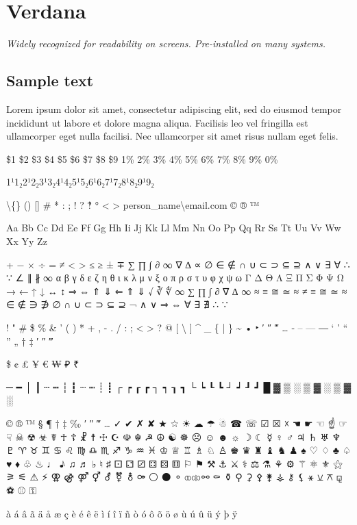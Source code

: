 \section{Verdana}
\emph{Widely recognized for readability on screens. Pre-installed on many systems.}
\begin{raggedright}
\section*{Sample text}
Lorem ipsum dolor sit amet, consectetur adipiscing elit, sed do eiusmod tempor incididunt ut labore et dolore magna aliqua. Facilisis leo vel fringilla est ullamcorper eget nulla facilisi. Nec ullamcorper sit amet risus nullam eget felis.

\$1 \$2 \$3 \$4 \$5 \$6 \$7 \$8 \$9 1\% 2\% 3\% 4\% 5\% 6\% 7\% 8\% 9\% 0\%

1¹1₂2¹2₂3¹3₂4¹4₂5¹5₂6¹6₂7¹7₂8¹8₂9¹9₂

\textbackslash\{\} () [] \# * : ; ! ? ‽ ° \textless{} \textgreater{} person\_name\textbackslash{}email.com © ® ™

Aa Bb Cc Dd Ee Ff Gg Hh Ii Jj Kk Ll Mm Nn Oo Pp Qq Rr Ss Tt Uu Vv Ww Xx Yy Zz

+ − × ÷ = ≠ < > ≤ ≥ ± ∓
∑ ∏ ∫ ∂ ∞ ∇ ∆ ∝ ∅ ∈ ∉ ∩ ∪ ⊂ ⊃ ⊆ ⊇ ∧ ∨ ∃ ∀ ∴ ∵ ∠ ∥ ∦ ∞
α β γ δ ε ζ η θ ι κ λ μ ν ξ ο π ρ σ τ υ φ χ ψ ω
Γ Δ Θ Λ Ξ Π Σ Φ Ψ Ω
→ ← ↑ ↓ ↔ ↕ ⇒ ⇔ ⇑ ⇓ ⇐ ⇑ ⇓
√ ∛ ∜ ∞ ∑ ∏ ∫ ∂ ∇ ∆ ∞ ≈ ≡ ≅ ≃ ≈ ≠ ≡ ≅ ≃ ≈
∈ ∉ ∋ ∌ ∅ ∩ ∪ ⊂ ⊃ ⊆ ⊇
¬ ∧ ∨ ⇒ ⇔ ∀ ∃ ∄ ∴ ∵

! " \# \$ \% \& ' ( ) * + , - . / : ; \textless{} \textgreater{} ? @ [ \textbackslash{} ] \^{} \_ \{ | \} \~{}
• ‣ ′ ″ ‴ … ‐ – — ― ‘ ’ “ ” „ † ‡ ′ ″ ‴

\$ ¢ £ ¥ € ₩ ₽ ₹

─ ━ │ ┃ ┄ ┅ ┆ ┇ ┈ ┉ ┊ ┋ ┌ ┍ ┎ ┏ ┐ ┑ ┒ ┓ └ ┕ ┖ ┗ ┘ ┙ ┚ ┛
█ ▓ ▒ ░ ▒ ▓ ░ ▒ ▓ ░

© ® ™ § ¶ † ‡ ‰ ′ ″ ‴ … ✓ ✔ ✗ ✘ ★ ☆ ☀ ☁ ☂ ☃ ☎ ☏ ☑ ☒ ☓ ☚ ☛ ☜ ☝ ☞ ☟ ☠ ☢ ☣ ☤ ☥ ☦ ☧ ☨ ☩ ☪ ☫ ☬ ☭ ☮ ☯ ☸ ☹ ☺ ☻ ☼ ☽ ☾ ☿ ♀ ♂ ♃ ♄ ♅ ♆ ♇ ♈ ♉ ♊ ♋ ♌ ♍ ♎ ♏ ♐ ♑ ♒ ♓ ♔ ♕ ♖ ♗ ♘ ♙ ♚ ♛ ♜ ♝ ♞ ♟ ♠ ♡ ♢ ♣ ♤ ♥ ♦ ♧ ♨ ♩ ♪ ♫ ♬ ♭ ♮ ♯ ⚀ ⚁ ⚂ ⚃ ⚄ ⚅ ⚐ ⚑ ⚒ ⚓ ⚔ ⚕ ⚖ ⚗ ⚘ ⚙ ⚚ ⚛ ⚜ ⚝ ⚞ ⚟ ⚠ ⚡ ⚢ ⚣ ⚤ ⚥ ⚦ ⚧ ⚨ ⚩ ⚪ ⚫ ⚬ ⚭ ⚮ ⚯ ⚰ ⚱ ⚲ ⚳ ⚴ ⚵ ⚶ ⚷ ⚸ ⚹ ⚺ ⚻ ⚼ ⚽ ⚾ ⚿

à á â ã ä å æ ç è é ê ë ì í î ï ñ ò ó ô õ ö ø ù ú û ü ý þ ÿ
\end{raggedright}

